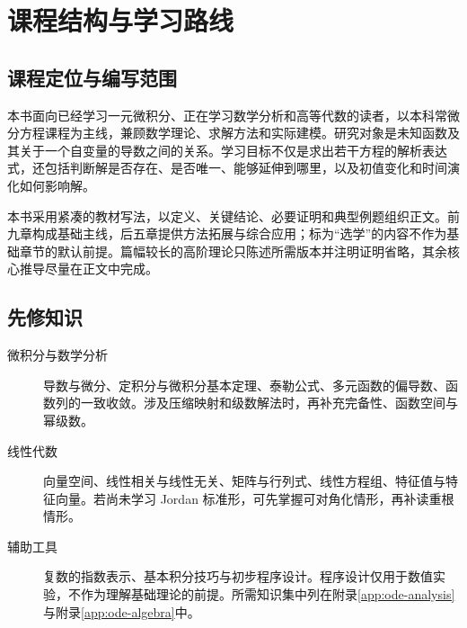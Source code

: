 \chapter{课程结构与学习路线}
\label{chap:ode-roadmap}

\section*{课程定位与编写范围}
本书面向已经学习一元微积分、正在学习数学分析和高等代数的读者，以本科常微分方程课程为主线，兼顾数学理论、求解方法和实际建模。研究对象是未知函数及其关于一个自变量的导数之间的关系。学习目标不仅是求出若干方程的解析表达式，还包括判断解是否存在、是否唯一、能够延伸到哪里，以及初值变化和时间演化如何影响解。

本书采用紧凑的教材写法，以定义、关键结论、必要证明和典型例题组织正文。前九章构成基础主线，后五章提供方法拓展与综合应用；标为“选学”的内容不作为基础章节的默认前提。篇幅较长的高阶理论只陈述所需版本并注明证明省略，其余核心推导尽量在正文中完成。

\section*{先修知识}
\begin{description}
  \item[微积分与数学分析] 导数与微分、定积分与微积分基本定理、泰勒公式、多元函数的偏导数、函数列的一致收敛。涉及压缩映射和级数解法时，再补充完备性、函数空间与幂级数。
  \item[线性代数] 向量空间、线性相关与线性无关、矩阵与行列式、线性方程组、特征值与特征向量。若尚未学习 Jordan 标准形，可先掌握可对角化情形，再补读重根情形。
  \item[辅助工具] 复数的指数表示、基本积分技巧与初步程序设计。程序设计仅用于数值实验，不作为理解基础理论的前提。所需知识集中列在附录\ref{app:ode-analysis}与附录\ref{app:ode-algebra}中。
\end{description}

